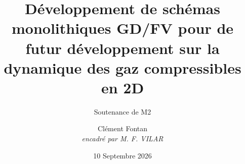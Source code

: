 \documentclass[9pt,french]{beamer}
\title{Développement de schémas
monolithiques GD/FV pour de futur développement sur la dynamique des gaz
compressibles en 2D}
\subtitle{Soutenance de M2}
\author{Clément Fontan\\
\textit{encadré par M. F. VILAR}}
\date{10 Septembre 2026}
\institute{Institut Montpelliérain Alexander Grothendieck, Université de Montpellier, France}
\begin{document}
\begin{frame}
\maketitle
\end{frame}

\begin{frame}
\tableofcontents
\end{frame}





\end{document}
